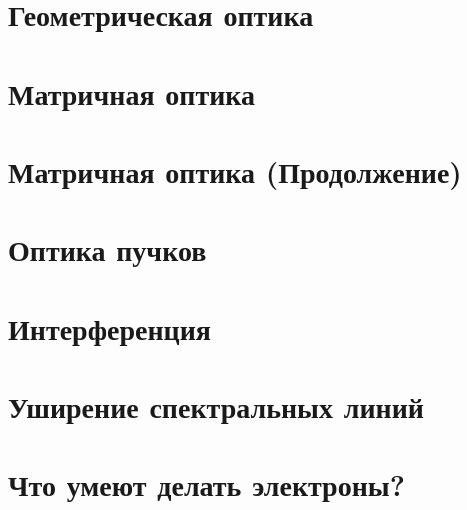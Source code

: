 


\section{Геометрическая оптика}

\newpage 

\section{Матричная оптика}


\section{Матричная оптика (Продолжение)}


\section{Оптика пучков}


\section{Интерференция}


\section{Уширение спектральных линий}


\section{Что умеют делать электроны?}



